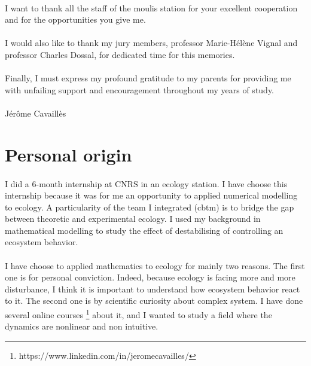 \documentclass{article}
\begin{document}
\paragraph{}
I want to thank all the staff of the moulis station for your excellent cooperation and for the opportunities you give me.

\paragraph{}
I would also like to thank my jury members, professor  Marie-Hélène Vignal and professor Charles Dossal, for dedicated time for this memories.

\paragraph{}
Finally, I must express my profound gratitude to my parents for providing me with unfailing support and encouragement throughout my years of study. 

\paragraph{}
Jérôme Cavaillès



\newpage
\section*{Personal origin}

\paragraph{}
I did a 6-month internship at CNRS in an ecology station. I have choose this internship because it was for me an opportunity to applied numerical modelling to ecology. A particularity of the team I integrated (cbtm) is to bridge the gap between theoretic and experimental ecology. I used my background in mathematical modelling to study the effect of destabilising of controlling an ecosystem behavior.


\paragraph{}
I have choose to applied mathematics to ecology for mainly two reasons. The first one is for personal conviction. Indeed, because ecology is facing more and more disturbance, I think it is important to understand how ecosystem behavior react to it. The second one is by scientific curiosity about complex system. I have done several online courses \footnote{https://www.linkedin.com/in/jeromecavailles/} about it, and  I wanted to study a field where the dynamics are nonlinear and non intuitive.
\end{document}
